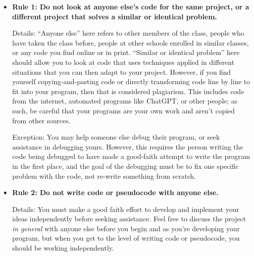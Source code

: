 \documentclass [letterpaper,11pt]{article}
\begin{document}
\begin{description}
\begin{itemize}
        \begin{itemize}
                \item \textbf{Rule 1: Do not look at anyone else's code for the same project, or a different project that solves a similar 
                or identical problem.}
                
                Details: ``Anyone else'' here refers to other members of the class, people who have taken the class before, people at other
                schools enrolled in similar classes, or any code you find online or in print.  ``Similar or identical problem'' here should 
                allow you to look at code that uses techniques applied in different situations that you can then 
                adapt to your project.  However, if you find yourself copying-and-pasting code or directly transforming
                code line by line to fit into your program, then that is considered plagiarism.  This includes code from the internet, automated programs like ChatGPT, or other people; as such, be careful that your programs are your own work and aren't copied from other sources.\newline
                              
                Exception: You may help someone else debug their program, or seek assistance in debugging yours.  However, 
                this requires the person writing the code being debugged to have made a good-faith attempt
                to write the program in the first place, and the goal of the debugging must be to fix
                one specific problem with the code, not re-write something from scratch.\newline
                
                \item \textbf{Rule 2: Do not write code or pseudocode with anyone else.}
                
                Details: You must make a good faith effort to develop and implement your ideas
                independently before seeking assistance.  Feel free to discuss the project \emph{in general} with anyone else
                before you begin and as you're developing your program, but when you get to the level of writing code or
                pseudocode, you should be working independently.
                
                        \end{itemize}
        \end{itemize}


\end{description}
\end{document}
